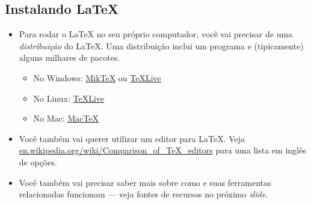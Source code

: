 \documentclass{beamer}
\begin{document}
\subsection{Instalando \LaTeX{}}
\begin{frame}{\insertsubsection}
\begin{itemize}
\item Para rodar o  \LaTeX{} no seu próprio computador, você vai precisar de uma \emph{distribuição} do \LaTeX{}. Uma distribuição inclui  um programa  e (tipicamente) alguns milhares de pacotes.
\begin{itemize}
\item No Windows: \href{http://miktex.org/}{Mik\TeX} ou \href{http://tug.org/texlive/}{\TeX Live}
\item No Linux: \href{http://tug.org/texlive/}{\TeX Live}
\item No Mac: \href{http://tug.org/mactex/}{Mac\TeX}
\end{itemize} 
\item Você também vai querer utilizar um editor para \LaTeX{}. Veja \url{en.wikipedia.org/wiki/Comparison_of_TeX_editors} para uma lista em inglês de opções.
\item Você também vai precisar saber mais sobre como  e suas ferramentas relacionadas funcionam --- veja fontes de recursos no próximo \emph{slide}.
\end{itemize}
\end{frame}

\end{document}
